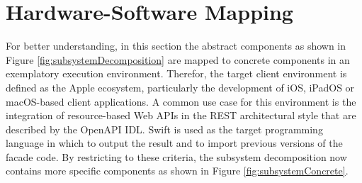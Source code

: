 \section{Hardware-Software Mapping}
\label{sec:HardwareSoftwareMapping}

For better understanding, in this section the abstract components as shown in Figure \ref{fig:subsystemDecomposition} are mapped to concrete components in an exemplatory execution environment. Therefor, the target client environment is defined as the Apple ecosystem, particularly the development of iOS, iPadOS or macOS-based client applications.  A common use case for this environment is the integration of resource-based Web APIs in the REST architectural style that are described by the OpenAPI \ac{IDL}. Swift is used as the target programming language in which to output the result and to import previous versions of the facade code. By restricting to these criteria, the subsystem decomposition now contains more specific components as shown in Figure \ref{fig:subsystemConcrete}. 

\begin{figure}[!h]
\end{figure}

